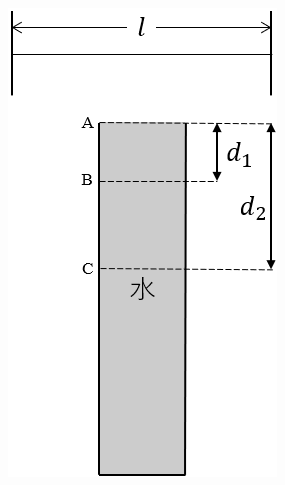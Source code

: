 \begin{figure}[htbp]
  \centering
  \begin{minipage}{.25\columnwidth}
    \centering
    \includegraphics[width=\columnwidth]{../graphs/osaka_ko_23_3-1.png}
    \caption{}
  \end{minipage}
  \begin{minipage}{.25\columnwidth}
    \centering

\end{minipage}
\end{figure}
